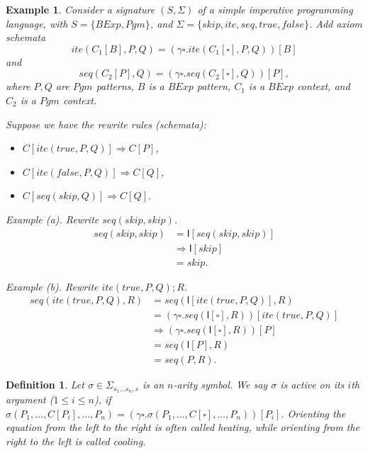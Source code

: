 \documentclass{article}
\theoremstyle{plain}
\newtheorem{defn}[thm]{Definition}
\newtheorem{eg}[thm]{Example}
\def\I{\textsf{I}}
\begin{document}
\begin{eg}
	Consider a signature $(S,\Sigma)$ of a simple imperative programming language, with $S = \{{BExp},{Pgm}\}$, and $\Sigma = \{skip, {ite}, {seq}, true, false\}$. Add axiom schemata $${ite}(C_1[B], P, Q) = (\gamma \square . {ite}(C_1[\square], P, Q))[B]$$ and $${seq}(C_2[P],Q) = (\gamma \square . {seq}(C_2[\square], Q))[P],$$ where $P, Q$ are ${Pgm}$ patterns, $B$ is a ${BExp}$ pattern, $C_1$ is a ${BExp}$ context, and $C_2$ is a ${Pgm}$ context.
	
	Suppose we have the rewrite rules (schemata):
	\begin{itemize}
		\item $C[{ite}({true}, P, Q)] \Rightarrow C[P]$,
		\item $C[{ite}({false}, P, Q)] \Rightarrow C[Q]$,
		\item $C[{seq}({skip},Q)] \Rightarrow C[Q]$.
	\end{itemize}
	
	Example (a). Rewrite $seq(skip,skip)$.
	\begin{align*}
	seq(skip,skip)
	&= \mathsf{I}[seq(skip,skip)] \\
	&\Rightarrow \mathsf{I}[skip] \\
	&= skip.
	\end{align*}
	
	Example (b). Rewrite $ite(true, P, Q); R$.
	\begin{align*}
	seq(ite(true, P, Q), R) 
	&= seq(\I[ite(true, P, Q)], R) \\
	&= (\gamma \square . seq(\I[\square], R))[ite(true, P, Q)] \\
	&\Rightarrow (\gamma \square . seq(\I[\square], R))[P] \\
	&= seq(\I[P], R) \\
	&= seq(P, R).
	\end{align*}
\end{eg}

\begin{defn}
	Let $\sigma \in \Sigma_{s_1\dots s_n, s}$ is an $n$-arity symbol. We say $\sigma$ is \emph{active} on its $i$th argument ($1 \le i \le n$), if
	$\sigma(P_1,\dots, C[P_i], \dots, P_n)
	= (\gamma \square . \sigma(P_1,\dots,C[\square], \dots, P_n))[P_i]$. Orienting the equation from the left to the right is often called \emph{heating}, while orienting from the right to the left is called \emph{cooling}.
\end{defn}
\end{document}
